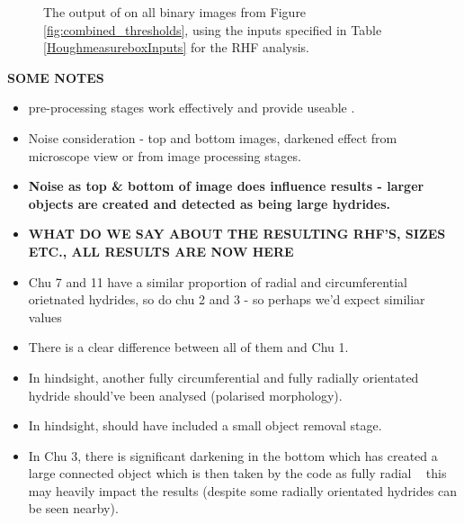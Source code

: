 \documentclass{article}
\begin{document}
\begin{figure}[H]
	        \caption{The output of  on all binary images from Figure \ref{fig:combined_thresholds}, using the inputs specified in Table \ref{HoughmeasureboxInputs} for the RHF analysis.}
	        \label{fig:RHF_results_all}
	\end{figure}

    \textbf{SOME NOTES}
    \begin{itemize}
        \item pre-processing stages work effectively and provide useable .
        \item Noise consideration - top and bottom images, darkened effect from microscope view or from image processing stages.
        \item \textbf{Noise as top \& bottom of image does influence results - larger objects are created and detected as being large hydrides.}
        \item \textbf{WHAT DO WE SAY ABOUT THE RESULTING RHF'S, SIZES ETC., ALL RESULTS ARE NOW HERE}
        \item Chu 7 and 11 have a similar proportion of radial and circumferential orietnated hydrides, so do chu 2 and 3 - so perhaps we'd expect similiar values
        \item There is a clear difference between all of them and Chu 1.
        \item In hindsight, another fully circumferential and fully radially orientated hydride should've been analysed (polarised morphology).
        \item In hindsight, should have included a small object removal stage.
        \item In Chu 3, there is significant darkening in the bottom which has created a large connected object which is then taken by the code as fully radial ~ this may heavily impact the results (despite some radially orientated hydrides can be seen nearby).
        \end{itemize}
\end{document}
